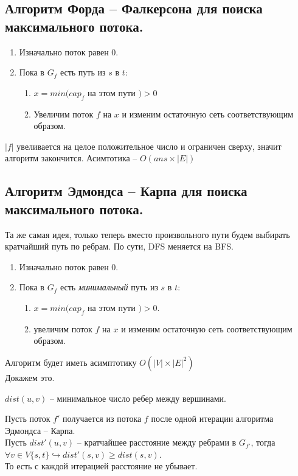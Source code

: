 \subsection{Алгоритм Форда -- Фалкерсона для поиска максимального потока.}
\begin{enumerate}
	\item Изначально поток равен 0.
	\item Пока в $G_f$ есть путь из  $s$ в  $t$:
		\begin{enumerate}
			\item $x = min(cap_f$ на этом пути  $) > 0$ 
			\item Увеличим поток $f$ на $x$ и изменим остаточную сеть соответствующим образом.
		\end{enumerate}
\end{enumerate}
$\lvert f \rvert$ увеливается на целое положительное число и ограничен сверху, значит алгоритм закончится.
Асимтотика -- $O(ans \times \lvert E  \rvert)$  \\

\subsection{Алгоритм Эдмондса -- Карпа для поиска максимального потока.}
Та же самая идея, только теперь вместо произвольного пути будем выбирать кратчайший путь по ребрам. По сути, DFS меняется на BFS.
\begin{enumerate}
	\item Изначально поток равен 0.
	\item Пока в $G_f$ есть \textit{минимальный} путь из $s $ в $t$:
		\begin{enumerate}
			\item $x = min(cap_f$ на этом пути $) > 0$.
			\item  увеличим поток $f$ на  $x$  и изменим остаточную сеть соответствующим образом.
		\end{enumerate}
\end{enumerate}

Алгоритм будет иметь асимптотику $O(\lvert V \rvert \times \lvert E \rvert ^ 2)$ \\

Докажем это.
\begin{Def}
	$dist(u, v)$ -- минимальное число ребер между вершинами.
\end{Def}

\begin{lemma}
	Пусть поток $f'$ получается из потока $f$ после одной итерации алгоритма Эдмондса -- Карпа. \\
	Пусть $dist'(u, v)$ -- кратчайшее расстояние между ребрами в $G_{f'}$, тогда
	$\forall v \in V \{s, t\} \hookrightarrow dist'(s, v) \geq dist(s, v)$.  \\
	То есть с каждой итерацией расстояние не убывает.
\end{lemma}

